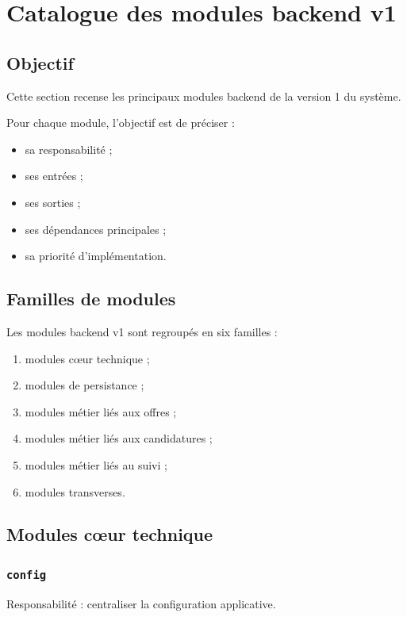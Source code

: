 \documentclass[11pt,a4paper]{article}
\begin{document}
\section{Catalogue des modules backend v1}

\subsection{Objectif}

Cette section recense les principaux modules backend de la version 1 du système.

Pour chaque module, l’objectif est de préciser :

\begin{itemize}
    \item sa responsabilité ;
    \item ses entrées ;
    \item ses sorties ;
    \item ses dépendances principales ;
    \item sa priorité d’implémentation.
\end{itemize}

\subsection{Familles de modules}

Les modules backend v1 sont regroupés en six familles :

\begin{enumerate}
    \item modules cœur technique ;
    \item modules de persistance ;
    \item modules métier liés aux offres ;
    \item modules métier liés aux candidatures ;
    \item modules métier liés au suivi ;
    \item modules transverses.
\end{enumerate}

\subsection{Modules cœur technique}

\subsubsection{\texttt{config}}
Responsabilité : centraliser la configuration applicative.
\end{document}
